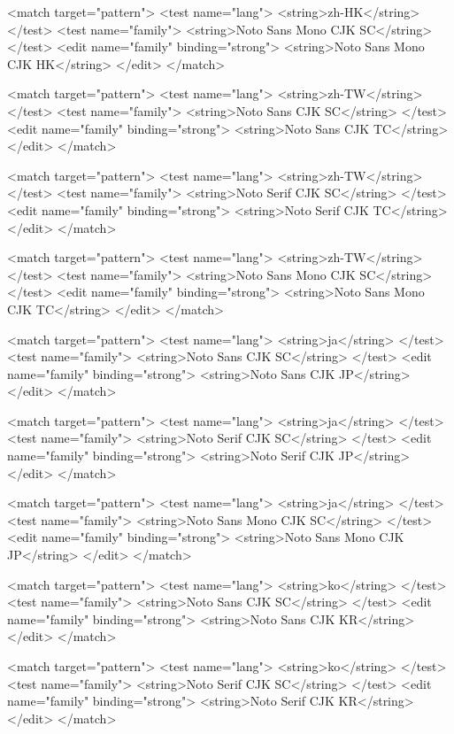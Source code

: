 \begin{lstcode}
  <match target="pattern">
    <test name="lang">
      <string>zh-HK</string>
    </test>
    <test name="family">
      <string>Noto Sans Mono CJK SC</string>
    </test>
    <edit name="family" binding="strong">
      <string>Noto Sans Mono CJK HK</string>
    </edit>
  </match>

  <match target="pattern">
    <test name="lang">
      <string>zh-TW</string>
    </test>
    <test name="family">
      <string>Noto Sans CJK SC</string>
    </test>
    <edit name="family" binding="strong">
      <string>Noto Sans CJK TC</string>
    </edit>
  </match>

  <match target="pattern">
    <test name="lang">
      <string>zh-TW</string>
    </test>
    <test name="family">
      <string>Noto Serif CJK SC</string>
    </test>
    <edit name="family" binding="strong">
      <string>Noto Serif CJK TC</string>
    </edit>
  </match>

  <match target="pattern">
    <test name="lang">
      <string>zh-TW</string>
    </test>
    <test name="family">
      <string>Noto Sans Mono CJK SC</string>
    </test>
    <edit name="family" binding="strong">
      <string>Noto Sans Mono CJK TC</string>
    </edit>
  </match>

  <match target="pattern">
    <test name="lang">
      <string>ja</string>
    </test>
    <test name="family">
      <string>Noto Sans CJK SC</string>
    </test>
    <edit name="family" binding="strong">
      <string>Noto Sans CJK JP</string>
    </edit>
  </match>

  <match target="pattern">
    <test name="lang">
      <string>ja</string>
    </test>
    <test name="family">
      <string>Noto Serif CJK SC</string>
    </test>
    <edit name="family" binding="strong">
      <string>Noto Serif CJK JP</string>
    </edit>
  </match>

  <match target="pattern">
    <test name="lang">
      <string>ja</string>
    </test>
    <test name="family">
      <string>Noto Sans Mono CJK SC</string>
    </test>
    <edit name="family" binding="strong">
      <string>Noto Sans Mono CJK JP</string>
    </edit>
  </match>

  <match target="pattern">
    <test name="lang">
      <string>ko</string>
    </test>
    <test name="family">
      <string>Noto Sans CJK SC</string>
    </test>
    <edit name="family" binding="strong">
      <string>Noto Sans CJK KR</string>
    </edit>
  </match>

  <match target="pattern">
    <test name="lang">
      <string>ko</string>
    </test>
    <test name="family">
      <string>Noto Serif CJK SC</string>
    </test>
    <edit name="family" binding="strong">
      <string>Noto Serif CJK KR</string>
    </edit>
  </match>


\end{lstcode}
